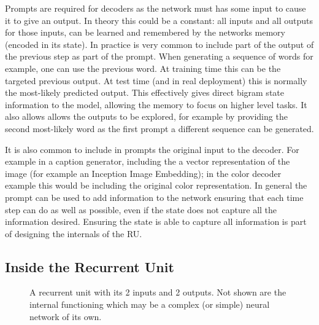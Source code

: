 \documentclass[12pt,parskip]{komatufte}\right
\begin{document}

Prompts are required for decoders as the network must has some input to cause it to give an output.
In theory this could be a constant: all inputs and all outputs for those inputs, can be learned and remembered by the networks memory (encoded in its state).
In practice is very common to include part of the output of the previous step as part of the prompt.
When generating a sequence of words for example, one can use the previous word.
At training time this can be the targeted previous output.
At test time (and in real deployment) this is normally the most-likely predicted output.
This effectively gives direct bigram state information to the model,
allowing the memory to focus on higher level tasks.
It also allows allows the outputs to be explored, for example by providing the second most-likely word as the first prompt a different sequence can be generated.

It is also common to include in prompts the original input to the decoder.
For example in a caption generator, including the a vector representation of the image (for example an Inception Image Embedding); in the color decoder example this would be including the original color representation.
In general the prompt can be used to add information to the network ensuring that each time step can do as well as possible, even if the state does not capture all the information desired.
Ensuring the state is able to capture all information is part of designing the internals of the RU.


\subsection{Inside the Recurrent Unit}
\begin{figure}
	\caption{A recurrent unit with its 2 inputs and 2 outputs. Not shown are the internal functioning which may be a complex (or simple) neural network of its own.}	
	
	\label{fig-ru}
	
	
\end{figure}

\end{document}
